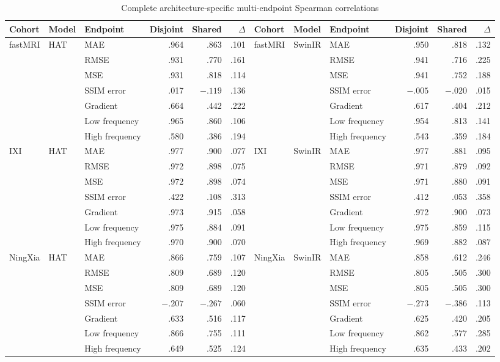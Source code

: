 \documentclass[journal,10pt]{IEEEtran}
\begin{document}
\begin{table}[t]
\caption{Complete architecture-specific multi-endpoint Spearman correlations}
\label{tab:allmetrics}\centering
\begin{tabular}{lllrrr@{\qquad}lllrrr}
\toprule
Cohort&Model&Endpoint&Disjoint&Shared&$\Delta$&Cohort&Model&Endpoint&Disjoint&Shared&$\Delta$\\
\midrule
fastMRI&HAT&MAE&.964&.863&.101&fastMRI&SwinIR&MAE&.950&.818&.132\\
& &RMSE&.931&.770&.161&& &RMSE&.941&.716&.225\\
& &MSE&.931&.818&.114&& &MSE&.941&.752&.188\\
& &SSIM error&.017&$-.119$&.136&& &SSIM error&$-.005$&$-.020$&.015\\
& &Gradient&.664&.442&.222&& &Gradient&.617&.404&.212\\
& &Low frequency&.965&.860&.106&& &Low frequency&.954&.813&.141\\
& &High frequency&.580&.386&.194&& &High frequency&.543&.359&.184\\
\midrule
IXI&HAT&MAE&.977&.900&.077&IXI&SwinIR&MAE&.977&.881&.095\\
& &RMSE&.972&.898&.075&& &RMSE&.971&.879&.092\\
& &MSE&.972&.898&.074&& &MSE&.971&.880&.091\\
& &SSIM error&.422&.108&.313&& &SSIM error&.412&.053&.358\\
& &Gradient&.973&.915&.058&& &Gradient&.972&.900&.073\\
& &Low frequency&.975&.884&.091&& &Low frequency&.975&.859&.115\\
& &High frequency&.970&.900&.070&& &High frequency&.969&.882&.087\\
\midrule
NingXia&HAT&MAE&.866&.759&.107&NingXia&SwinIR&MAE&.858&.612&.246\\
& &RMSE&.809&.689&.120&& &RMSE&.805&.505&.300\\
& &MSE&.809&.689&.120&& &MSE&.805&.505&.300\\
& &SSIM error&$-.207$&$-.267$&.060&& &SSIM error&$-.273$&$-.386$&.113\\
& &Gradient&.633&.516&.117&& &Gradient&.625&.420&.205\\
& &Low frequency&.866&.755&.111&& &Low frequency&.862&.577&.285\\
& &High frequency&.649&.525&.124&& &High frequency&.635&.433&.202\\
\bottomrule
\end{tabular}
\end{table}
\end{document}
